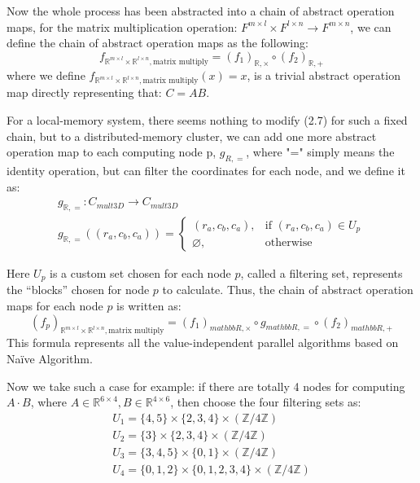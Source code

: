 \documentclass{amsart}
\theoremstyle{definition}
\theoremstyle{remark}
\numberwithin{equation}{section}
\begin{document}
	Now the whole process has been abstracted into a chain of abstract operation maps, for the matrix multiplication operation: $F^{m\times l}\times F^{l\times n}\to F^{m\times n}$, we can define the chain of abstract operation maps as the following:
\begin{equation}
f_{\mathbb{R}^{m\times l}\times\mathbb{R}^{l\times n},\text{matrix multiply}} = (f_1)_{\mathbb{R},\times}\circ(f_2)_{\mathbb{R},+}
\end{equation}
	where we define $f_{\mathbb{R}^{m\times l}\times\mathbb{R}^{l\times n},\text{matrix multiply}}(x)=x$, is a trivial abstract operation map directly representing that: $C=AB$.\par
	For a local-memory system, there seems nothing to modify (2.7) for such a fixed chain, but to a distributed-memory cluster, we can add one more abstract operation map to each computing node p, $g_{R,=}$, where "=" simply means the identity operation, but can filter the coordinates for each node, and we define it as:
\begin{equation}
\begin{array}{l}  
g_{\mathbb{R},=}:C_{mult3D}\to C_{mult3D}\\
g_{\mathbb{R},=}((r_a,c_b,c_a))=
	\left\{
	\begin{array}{ll}  
          (r_a,c_b,c_a), &\text{if } (r_a,c_b,c_a)\in U_p  \\ 
          \varnothing, &\text{otherwise}
	\end{array}
	\right.
\end{array}
\end{equation} 
\par
	Here $U_p$ is a custom set chosen for each node $p$, called a filtering set, represents the “blocks” chosen for node $p$ to calculate. Thus, the chain of abstract operation maps for each node $p$ is written as:
\begin{equation}
(f_p)_{\mathbb{R}^{m\times l}\times\mathbb{R}^{l\times n},\text{matrix multiply}}=
(f_1)_{mathbb{R},\times}\circ g_{mathbb{R},=}\circ(f_2)_{mathbb{R},+}
\end{equation}
This formula represents all the value-independent parallel algorithms based on Naïve Algorithm.
\par
Now we take such a case for example: if there are totally 4 nodes for computing $A\cdot B$, where $A\in \mathbb{R}^{6\times4},B\in \mathbb{R}^{4\times6}$, then choose the four filtering sets as:
\begin{equation}
\begin{array}{l}  
      U_1=\{4,5\}\times\{2,3,4\}\times(\mathbb{Z}/4\mathbb{Z}) \\ U_2=\{3\}\times\{2,3,4\}\times(\mathbb{Z}/4\mathbb{Z})\\ 
      U_3=\{3,4,5\}\times\{0,1\}\times(\mathbb{Z}/4\mathbb{Z}) \\ U_4=\{0,1,2\}\times\{0,1,2,3,4\}\times(\mathbb{Z}/4\mathbb{Z}) 
\end{array}
\end{equation}
\end{document}
